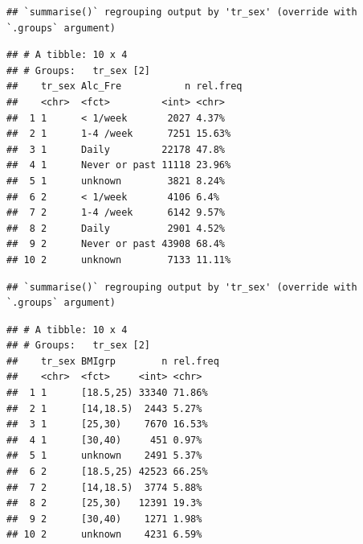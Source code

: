 \documentclass[
]{article}
\newenvironment{Shaded}{\begin{snugshade}}{\end{snugshade}}
\newcommand{\DataTypeTok}[1]{\textcolor[rgb]{0.13,0.29,0.53}{#1}}
\newcommand{\DecValTok}[1]{\textcolor[rgb]{0.00,0.00,0.81}{#1}}
\newcommand{\KeywordTok}[1]{\textcolor[rgb]{0.13,0.29,0.53}{\textbf{#1}}}
\newcommand{\NormalTok}[1]{#1}
\newcommand{\OperatorTok}[1]{\textcolor[rgb]{0.81,0.36,0.00}{\textbf{#1}}}
\newcommand{\OtherTok}[1]{\textcolor[rgb]{0.56,0.35,0.01}{#1}}
\newcommand{\StringTok}[1]{\textcolor[rgb]{0.31,0.60,0.02}{#1}}
\begin{document}
\begin{verbatim}
## `summarise()` regrouping output by 'tr_sex' (override with `.groups` argument)
\end{verbatim}

\begin{verbatim}
## # A tibble: 10 x 4
## # Groups:   tr_sex [2]
##    tr_sex Alc_Fre           n rel.freq
##    <chr>  <fct>         <int> <chr>   
##  1 1      < 1/week       2027 4.37%   
##  2 1      1-4 /week      7251 15.63%  
##  3 1      Daily         22178 47.8%   
##  4 1      Never or past 11118 23.96%  
##  5 1      unknown        3821 8.24%   
##  6 2      < 1/week       4106 6.4%    
##  7 2      1-4 /week      6142 9.57%   
##  8 2      Daily          2901 4.52%   
##  9 2      Never or past 43908 68.4%   
## 10 2      unknown        7133 11.11%
\end{verbatim}

\begin{Shaded}
\end{Shaded}

\begin{verbatim}
## `summarise()` regrouping output by 'tr_sex' (override with `.groups` argument)
\end{verbatim}

\begin{verbatim}
## # A tibble: 10 x 4
## # Groups:   tr_sex [2]
##    tr_sex BMIgrp        n rel.freq
##    <chr>  <fct>     <int> <chr>   
##  1 1      [18.5,25) 33340 71.86%  
##  2 1      [14,18.5)  2443 5.27%   
##  3 1      [25,30)    7670 16.53%  
##  4 1      [30,40)     451 0.97%   
##  5 1      unknown    2491 5.37%   
##  6 2      [18.5,25) 42523 66.25%  
##  7 2      [14,18.5)  3774 5.88%   
##  8 2      [25,30)   12391 19.3%   
##  9 2      [30,40)    1271 1.98%   
## 10 2      unknown    4231 6.59%
\end{verbatim}
\end{document}
